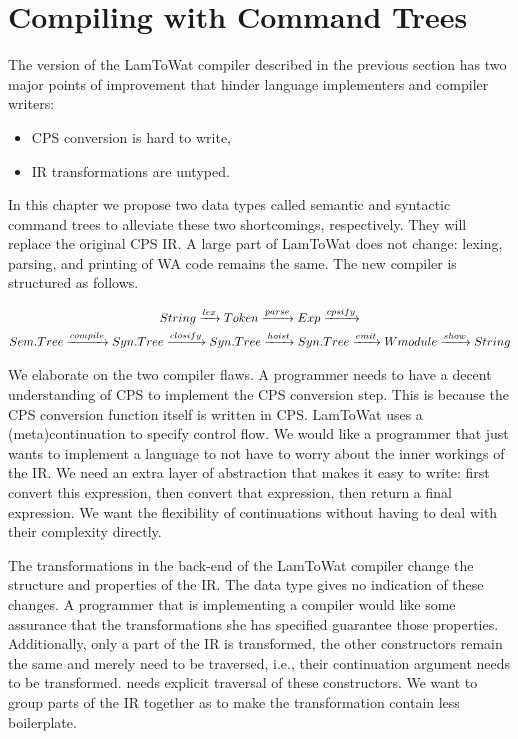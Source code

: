 
\chapter{\label{chap:treecomp}Compiling with Command Trees}
The version of the LamToWat compiler described in the previous section has two major points of improvement that hinder language implementers and compiler writers:

\begin{itemize}
\item \ac{CPS} conversion is hard to write,
\item \ac{IR} transformations are untyped.
\end{itemize}

In this chapter we propose two data types called semantic and syntactic command trees to alleviate these two shortcomings, respectively. They will replace the original \ac{CPS} \ac{IR}. A large part of LamToWat does not change: lexing, parsing, and printing of \ac{WA} code remains the same. The new compiler is structured as follows.

\begin{gather*}
  String \xrightarrow{lex} Token \xrightarrow{parse} Exp \xrightarrow{cpsify}\\
  Sem.Tree \xrightarrow{compile} Syn.Tree \xrightarrow{closify} Syn.Tree \xrightarrow{hoist} Syn.Tree \xrightarrow{emit} Wmodule \xrightarrow{show} String
\end{gather*}

We elaborate on the two compiler flaws. A programmer needs to have a decent understanding of \ac{CPS} to implement the \ac{CPS} conversion step. This is because the \ac{CPS} conversion function itself is written in \ac{CPS}. LamToWat uses a (meta)continuation to specify control flow. We would like a programmer that just wants to implement a language to not have to worry about the inner workings of the \ac{IR}. We need an extra layer of abstraction that makes it easy to write: first convert this expression, then convert that expression, then return a final expression. We want the flexibility of continuations without having to deal with their complexity directly.

The transformations in the back-end of the LamToWat compiler change the structure and properties of the \ac{IR}. The  data type gives no indication of these changes. A programmer that is implementing a compiler would like some assurance that the transformations she has specified guarantee those properties. Additionally, only a part of the \ac{IR} is transformed, the other constructors remain the same and merely need to be traversed, i.e., their continuation argument needs to be transformed.  needs explicit traversal of these constructors. We want to group parts of the \ac{IR} together as to make the transformation contain less boilerplate.

